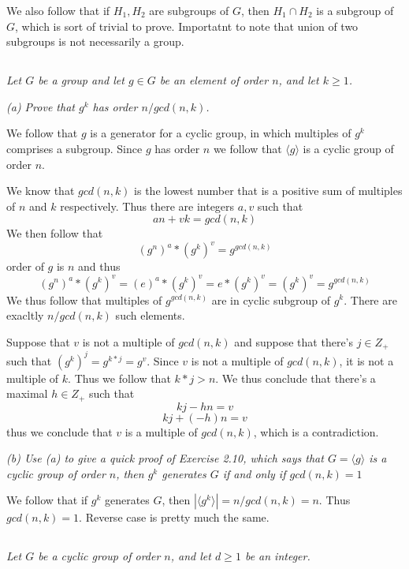 \documentclass[11pt,oneside,titlepage]{book}
\newcommand{\eangle}[1]{\langle #1 \rangle}
\begin{document}
We also follow that if $H_1, H_2$ are subgroups of $G$, then $H_1 \cap
H_2$ is a subgroup of $G$, which is sort of trivial to
prove. Importatnt to note that union of two subgroups is not
necessarily a group.

\subsection{}

\textit{Let $G$ be a group and let $g \in G$ be an element of order
$n$, and let $k \geq 1$.}

\textit{(a) Prove that $g^k$ has order $n / gcd(n, k)$.}

We follow that $g$ is a generator for a cyclic group, in which
multiples of $g^k$ comprises a subgroup. Since $g$ has order $n$ we
follow that $\eangle{g}$ is a cyclic group of order $n$.

We know that $gcd(n, k)$ is the lowest number that is a positive sum
of multiples of $n$ and $k$ respectively. Thus there are integers $a,
v$ such that
$$an + vk = gcd(n, k)$$
We then follow that
$$(g^n)^a * (g^k)^v = g^{gcd(n, k)}$$
order of $g$ is $n$ and thus
$$(g^n)^a * (g^k)^v = (e)^a * (g^k)^v = e * (g^k)^v = (g^k)^v = g^{gcd(n, k)}$$
We thus follow that multiples of $g^{gcd(n, k)}$ are in cyclic
subgroup of $g^k$. There are exacltly $n / gcd(n, k)$ such elements.

Suppose that $v$ is not a multiple of $gcd(n, k)$ and suppose that
there's $j \in Z_+$ such that $(g^k)^j = g^{k * j} = g^v$. Since $v$
is not a multiple of $gcd(n, k)$, it is not a multiple of $k$. Thus we
follow that $k * j > n$. We thus conclude that there's a maximal $h
\in Z_+$ such that
$$kj - hn = v$$
$$kj + (-h)n = v$$
thus we conclude that $v$ is a multiple of $gcd(n, k)$, which is a
contradiction.

\textit{(b) Use (a) to give a quick proof of Exercise 2.10, which says
that $G = \eangle{g}$ is a cyclic group of order $n$, then $g^k$
generates $G$ if and only if $gcd(n, k) = 1$ }

We follow that if $g^k$ generates $G$, then $|\eangle{g^k}| = n /
gcd(n, k) = n$. Thus $gcd(n, k) = 1$. Reverse case is pretty much the
same.

\subsection{}

\textit{Let $G$ be a cyclic group of order $n$, and let $d \geq 1$ be
an integer.}
\end{document}
